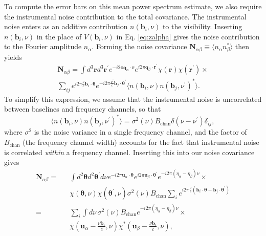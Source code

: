 \documentclass[twocolumn,aps,prd,nofootinbib,showpacs]{revtex4-1}
\begin{document}
To compute the error bars on this mean power spectrum estimate, we also require the instrumental noise contribution to the total covariance.  The instrumental noise enters as an additive contribution $n(\mathbf{b}_i,\nu)$ to the visibility.  Inserting $n(\mathbf{b}_i,\nu)$ in the place of $V(\mathbf{b}_i, \nu)$ in Eq. \eqref{eq:zalpha} gives the noise contribution to the Fourier amplitude $n_\alpha$.  Forming the noise covariance $\mathbf{N}_{\alpha \beta} \equiv \langle n_\alpha n_\beta^* \rangle$ then yields
\begin{eqnarray}
\mathbf{N}_{\alpha \beta} = \int d^3 \mathbf{r} d^3 \mathbf{r}^\prime e^{-i 2\pi \mathbf{q}_\alpha \cdot \mathbf{r}} e^{i 2 \pi \mathbf{q}_\beta \cdot \mathbf{r}^\prime} \chi( \mathbf{r} ) \chi( \mathbf{r}^\prime) \times \nonumber \\
\sum_{ij} e^{i 2 \pi \frac{\nu}{c} \mathbf{b}_i \cdot \boldsymbol \theta} e^{-i 2 \pi \frac{\nu^\prime}{c} \mathbf{b}_j \cdot \boldsymbol \theta^\prime} \langle n(\mathbf{b}_i,\nu) n(\mathbf{b}_j,\nu^\prime)^* \rangle.
\end{eqnarray}
To simplify this expression, we assume that the instrumental noise is uncorrelated between baselines and frequency channels, so that
\begin{equation}
 \langle n(\mathbf{b}_i,\nu) n(\mathbf{b}_j,\nu^\prime)^* \rangle = \sigma^2 (\nu) B_\textrm{chan} \delta(\nu- \nu^\prime) \delta_{ij},
\end{equation}
where $\sigma^2$ is the noise variance in a single frequency channel, and the factor of $B_\textrm{chan}$ (the frequency channel width) accounts for the fact that instrumental noise is correlated \emph{within} a frequency channel.  Inserting this into our noise covariance gives
\begin{eqnarray}
\mathbf{N}_{\alpha \beta}  =  && \int d^2 \boldsymbol \theta d^2 \boldsymbol \theta^\prime d\nu e^{-i 2\pi \mathbf{u}_\alpha \cdot \boldsymbol \theta}  e^{i 2\pi \mathbf{u}_\beta \cdot \boldsymbol \theta^\prime} e^{-i 2\pi (\eta_\alpha - \eta_\beta) \nu} \times \nonumber \\
&& \chi(\boldsymbol \theta, \nu) \chi(\boldsymbol \theta^\prime, \nu) \sigma^2 (\nu) B_\textrm{chan} \sum_i e^{i 2\pi \frac{\nu}{c} (\mathbf{b}_i \cdot \boldsymbol \theta - \mathbf{b}_j \cdot \boldsymbol \theta^\prime)} \nonumber \\
= && \sum_i \int d\nu\, \sigma^2 (\nu) B_\textrm{chan} e^{-i 2\pi (\eta_\alpha - \eta_\beta) \nu} \times \nonumber \\
&& \overline{\chi} \left(\mathbf{u}_\alpha - \frac{\nu \mathbf{b}_i}{c}, \nu \right) \overline{\chi}^* \left(\mathbf{u}_\beta - \frac{\nu \mathbf{b}_i}{c}, \nu \right),
\end{eqnarray}
\end{document}
